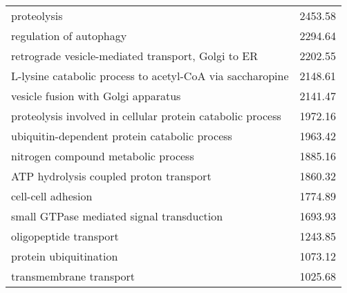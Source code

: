 \begin{table}[hp]
\begin{center}
\begin{tabular}{p{}r}
proteolysis                                                   & 2453.58                     \\ %
regulation of autophagy                                       & 2294.64                     \\ %
retrograde vesicle-mediated transport, Golgi to ER            & 2202.55                     \\
L-lysine catabolic process to acetyl-CoA via saccharopine     & 2148.61                     \\
vesicle fusion with Golgi apparatus                           & 2141.47                     \\
proteolysis involved in cellular protein catabolic process    & 1972.16                     \\
ubiquitin-dependent protein catabolic process                 & 1963.42                     \\
nitrogen compound metabolic process                           & 1885.16                     \\ %
ATP hydrolysis coupled proton transport                       & 1860.32                     \\ 
cell-cell adhesion                                            & 1774.89                     \\ %
small GTPase mediated signal transduction                     & 1693.93                     \\
oligopeptide transport                                        & 1243.85                     \\
protein ubiquitination                                        & 1073.12                     \\
transmembrane transport                                       & 1025.68                     \\

\end{tabular}
\end{center}
\end{table}
